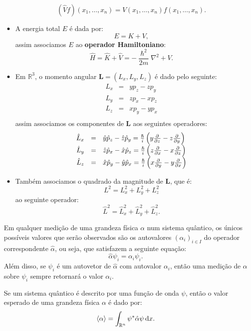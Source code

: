 \documentclass[11pt,twoside,a4paper]{book}
\begin{document}
\begin{postulado}
\begin{itemize}
\[
(\hat{V}f)(x_1,\dots,x_n)=V(x_1,\dots,x_n)f(x_1,\dots,x_n).
\]
\item A energia total $E$ é dada por:
\[
E=K+V,
\]
assim associamos $E$ ao \textbf{operador Hamiltoniano}:
\[
\hat{H}=\hat{K}+\hat{V}=-\frac{\hslash^2}{2m}\nabla^2+V.
\]
\item Em $\mathbb{R}^3$, o momento angular $\bm{L}=(L_x,L_y,L_z)$ é dado pelo seguinte:
\[
\begin{array}{rcl}
L_x&=&yp_z-zp_y\\
L_y&=&zp_x-xp_z\\
L_z&=&xp_y-yp_x\\
\end{array}
\]
assim associamos os componentes de $\bm{L}$ aos seguintes operadores:
\[
\begin{array}{rclcl}
\hat{L}_x&=&\hat{y}\hat{p}_z-\hat{z}\hat{p}_y=\frac{\hslash}{i}\left(y\pd{}{z}-z\pd{}{y}\right)\\
\hat{L}_y&=&\hat{z}\hat{p}_x-\hat{x}\hat{p}_z=\frac{\hslash}{i}\left(z\pd{}{x}-x\pd{}{z}\right)\\
\hat{L}_z&=&\hat{x}\hat{p}_y-\hat{y}\hat{p}_x=\frac{\hslash}{i}\left(x\pd{}{y}-y\pd{}{x}\right)\\
\end{array}
\]
\item Também associamos o quadrado da magnitude de $\bm{L}$, que é:
\[
L^2=L_x^2+L_y^2+L_z^2
\]
ao seguinte operador:
\[
\hat{L}^2=\hat{L}_x^2+\hat{L}_y^2+\hat{L}_z^2.
\]
\end{itemize}
\end{postulado}

\begin{postulado}
Em qualquer medição de uma grandeza física $\alpha$ num sistema quântico, os únicos possíveis valores que serão observados são os autovalores $(\alpha_i)_{i\in I}$ do operador correspondente $\hat{\alpha}$, ou seja, que satisfazem a seguinte equação:
\[
\hat{\alpha}\psi_i=\alpha_i\psi_i.
\]
Além disso, se $\psi_i$ é um autovetor de $\hat{\alpha}$ com autovalor $\alpha_i$, então uma medição de $\alpha$ sobre $\psi_i$ sempre retornará o valor $\alpha_i$.
\end{postulado}

\begin{postulado}
Se um sistema quântico é descrito por uma função de onda $\psi$, então o valor esperado de uma grandeza física $\alpha$ é dado por:
\[
\langle\alpha\rangle=\int_{\mathbb{R}^n}\psi^*\hat{\alpha}\psi\dif x.
\]
\end{postulado}
\end{document}
